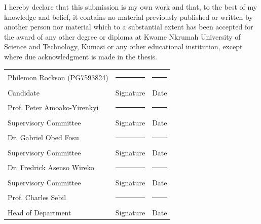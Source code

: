 \noindent I hereby declare that this submission is my own work and that, to the best of my knowledge and belief, it contains no material previously published or written by another person nor material which to a substantial extent has been accepted for the award of any other degree or diploma at Kwame Nkrumah University of Science and Technology, Kumasi or any other educational institution, except where due acknowledgment is made in the thesis.

\vspace{1cm}
\noindent\begin{tabularx}{\linewidth}{@{}Xll@{}}
Philemon Rockson (PG7593824) & \rule{2.7cm}{0.4pt} & \rule{2.2cm}{0.4pt} \\
Candidate & Signature & Date \\[1cm]
Prof. Peter Amoako-Yirenkyi & \rule{2.7cm}{0.4pt} & \rule{2.2cm}{0.4pt} \\
Supervisory Committee & Signature & Date \\[1cm]
Dr. Gabriel Obed Fosu & \rule{2.7cm}{0.4pt} & \rule{2.2cm}{0.4pt} \\
Supervisory Committee & Signature & Date \\[1cm]
Dr. Fredrick Asenso Wireko & \rule{2.7cm}{0.4pt} & \rule{2.2cm}{0.4pt} \\
Supervisory Committee & Signature & Date \\[1cm]
Prof. Charles Sebil & \rule{2.7cm}{0.4pt} & \rule{2.2cm}{0.4pt} \\
Head of Department & Signature & Date
\end{tabularx}
